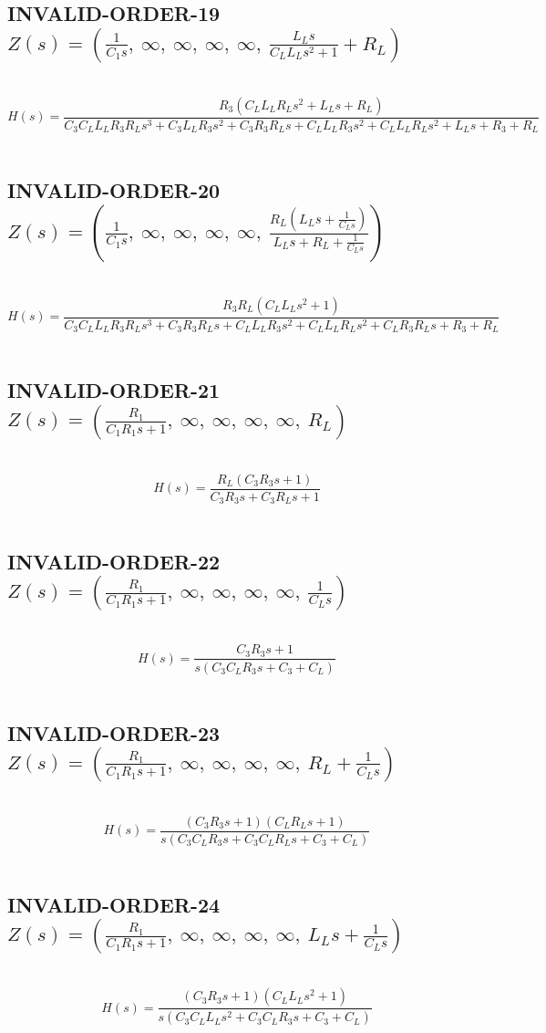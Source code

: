 \documentclass{article}
\begin{document}
\subsection{INVALID-ORDER-19 $Z(s) = \left( \frac{1}{C_{1} s}, \  \infty, \  \infty, \  \infty, \  \infty, \  \frac{L_{L} s}{C_{L} L_{L} s^{2} + 1} + R_{L}\right)$ } \ 
\textbf{\[H(s) = \frac{R_{3} \left(C_{L} L_{L} R_{L} s^{2} + L_{L} s + R_{L}\right)}{C_{3} C_{L} L_{L} R_{3} R_{L} s^{3} + C_{3} L_{L} R_{3} s^{2} + C_{3} R_{3} R_{L} s + C_{L} L_{L} R_{3} s^{2} + C_{L} L_{L} R_{L} s^{2} + L_{L} s + R_{3} + R_{L}}\] } \ 
\subsection{INVALID-ORDER-20 $Z(s) = \left( \frac{1}{C_{1} s}, \  \infty, \  \infty, \  \infty, \  \infty, \  \frac{R_{L} \left(L_{L} s + \frac{1}{C_{L} s}\right)}{L_{L} s + R_{L} + \frac{1}{C_{L} s}}\right)$ } \ 
\textbf{\[H(s) = \frac{R_{3} R_{L} \left(C_{L} L_{L} s^{2} + 1\right)}{C_{3} C_{L} L_{L} R_{3} R_{L} s^{3} + C_{3} R_{3} R_{L} s + C_{L} L_{L} R_{3} s^{2} + C_{L} L_{L} R_{L} s^{2} + C_{L} R_{3} R_{L} s + R_{3} + R_{L}}\] } \ 
\subsection{INVALID-ORDER-21 $Z(s) = \left( \frac{R_{1}}{C_{1} R_{1} s + 1}, \  \infty, \  \infty, \  \infty, \  \infty, \  R_{L}\right)$ } \ 
\textbf{\[H(s) = \frac{R_{L} \left(C_{3} R_{3} s + 1\right)}{C_{3} R_{3} s + C_{3} R_{L} s + 1}\] } \ 
\subsection{INVALID-ORDER-22 $Z(s) = \left( \frac{R_{1}}{C_{1} R_{1} s + 1}, \  \infty, \  \infty, \  \infty, \  \infty, \  \frac{1}{C_{L} s}\right)$ } \ 
\textbf{\[H(s) = \frac{C_{3} R_{3} s + 1}{s \left(C_{3} C_{L} R_{3} s + C_{3} + C_{L}\right)}\] } \ 
\subsection{INVALID-ORDER-23 $Z(s) = \left( \frac{R_{1}}{C_{1} R_{1} s + 1}, \  \infty, \  \infty, \  \infty, \  \infty, \  R_{L} + \frac{1}{C_{L} s}\right)$ } \ 
\textbf{\[H(s) = \frac{\left(C_{3} R_{3} s + 1\right) \left(C_{L} R_{L} s + 1\right)}{s \left(C_{3} C_{L} R_{3} s + C_{3} C_{L} R_{L} s + C_{3} + C_{L}\right)}\] } \ 
\subsection{INVALID-ORDER-24 $Z(s) = \left( \frac{R_{1}}{C_{1} R_{1} s + 1}, \  \infty, \  \infty, \  \infty, \  \infty, \  L_{L} s + \frac{1}{C_{L} s}\right)$ } \ 
\textbf{\[H(s) = \frac{\left(C_{3} R_{3} s + 1\right) \left(C_{L} L_{L} s^{2} + 1\right)}{s \left(C_{3} C_{L} L_{L} s^{2} + C_{3} C_{L} R_{3} s + C_{3} + C_{L}\right)}\] } \ 
\end{document}
